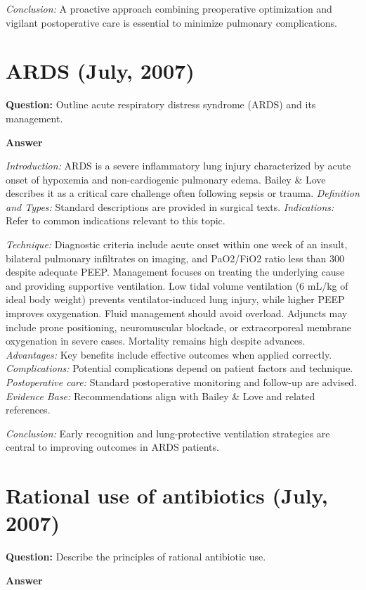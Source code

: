 \documentclass{article}
\begin{document}
\emph{Conclusion:} A proactive approach combining preoperative optimization and vigilant postoperative care is essential to minimize pulmonary complications.


\section{ARDS (July, 2007)}

\textbf{Question:} Outline acute respiratory distress syndrome (ARDS) and its management.

\textbf{Answer}

\emph{Introduction:} ARDS is a severe inflammatory lung injury characterized by acute onset of hypoxemia and non-cardiogenic pulmonary edema. Bailey \& Love describes it as a critical care challenge often following sepsis or trauma.
\emph{Definition and Types:} Standard descriptions are provided in surgical texts.
\emph{Indications:} Refer to common indications relevant to this topic.

\emph{Technique:} Diagnostic criteria include acute onset within one week of an insult, bilateral pulmonary infiltrates on imaging, and PaO2/FiO2 ratio less than 300 despite adequate PEEP. Management focuses on treating the underlying cause and providing supportive ventilation. Low tidal volume ventilation (6 mL/kg of ideal body weight) prevents ventilator-induced lung injury, while higher PEEP improves oxygenation. Fluid management should avoid overload. Adjuncts may include prone positioning, neuromuscular blockade, or extracorporeal membrane oxygenation in severe cases. Mortality remains high despite advances.
\emph{Advantages:} Key benefits include effective outcomes when applied correctly.
\emph{Complications:} Potential complications depend on patient factors and technique.
\emph{Postoperative care:} Standard postoperative monitoring and follow-up are advised.
\emph{Evidence Base:} Recommendations align with Bailey \& Love and related references.

\emph{Conclusion:} Early recognition and lung-protective ventilation strategies are central to improving outcomes in ARDS patients.


\section{Rational use of antibiotics (July, 2007)}

\textbf{Question:} Describe the principles of rational antibiotic use.

\textbf{Answer}
\end{document}
